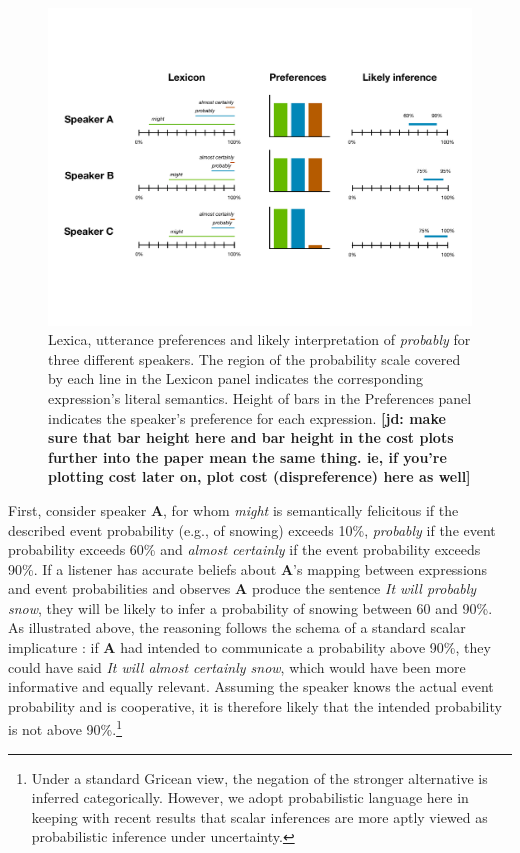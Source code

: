 \documentclass[lucida,biblatex]{sp} %
\newcommand{\jd}[1]{\textbf{\color{green}[jd: #1]}}
\begin{document}
\begin{figure}
\center
\includegraphics[width=\textwidth]{plots/implicatures.pdf}
\caption{Lexica, utterance preferences and likely interpretation of \textit{probably} for three different speakers. The region of the probability scale covered by each line in the Lexicon panel indicates the corresponding expression's literal semantics. Height of bars in the Preferences panel indicates the speaker's preference for each expression.    \jd{make sure that bar height here and bar height in the cost plots further into the paper mean the same thing. ie, if you're plotting cost later on, plot cost (dispreference) here as well}}
\label{fig:inference-example}
\end{figure}

First, consider speaker {\bf A}, for whom \textit{might} is semantically felicitous if the described event probability (e.g., of snowing) exceeds 10\%, 
\textit{probably} if the event probability exceeds 60\% and \textit{almost certainly}  if the event probability exceeds 90\%.  If a listener has accurate beliefs about {\bf A}'s mapping between expressions and event probabilities and observes {\bf A}  produce the sentence \emph{It will probably snow}, they will be likely to infer a probability of snowing between 60 and 90\%. As illustrated above, the reasoning follows the schema of a standard scalar implicature \citep{Grice1975, Horn1984}: if  {\bf A} had intended to communicate a probability above 90\%, they could have said \emph{It will almost certainly snow}, which would have been more informative and equally relevant. Assuming the speaker knows the actual event probability and is cooperative, it is therefore likely that the intended probability is not above 90\%.\footnote{Under a standard Gricean view, the negation of the stronger alternative is inferred categorically. However, we adopt probabilistic language here in keeping with recent results that scalar inferences are more aptly viewed as probabilistic inference under uncertainty.} 
\end{document}
